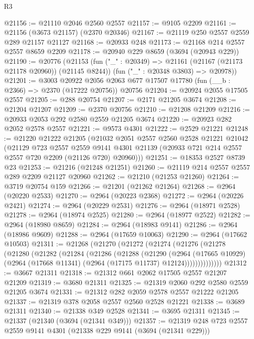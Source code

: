 \begin{lexlean}{R3}
\begin{coremodule}
@21156 := @21110 @2046 @2560 @2557
@21157 := @9105 @2209
@21161 := @21156 (@3673 @21157) (@2370 @20346)
@21167 := @21119 @250 @2557 @2559 @289 @21157 @21127
@21168 := @20933 @248
@21173 := @21168 @214 @2557 @2557 @8659 @2209
@21178 := @20940 @229 @8659 (@3694 (@20943 @229))
@21190 := @20776
    (@21153
      (fun ("_" : @20349) => @21161 (@21167 (@21173 @21178 @20960)) (@21145 @8244))
      (fun ("_" : @20348 @3803) => @20978))
@21201 := @3003
    @20922
    @2056
    @2063
    @677
    @17507
    @17780
    (fun (__b : @2366) => @2370 (@17222 @20756))
    @20756
@21204 := @20924 @2055 @17505 @2557
@21205 := @288 @20754
@21207 := @2171 @21205 @3674
@21208 := @21204 @21207
@21209 := @2370 @20756
@21210 := @21208 @21209
@21216 := @20933 @2053 @292 @2580 @2559 @21205 @3674
@21220 := @20923 @282 @2052 @2578 @2557
@21221 := @9573 @4301
@21222 := @2529 @21221
@21248 := @21220
    @21222
    @21205
    (@21032
      @2051
      @2557
      @2560
      @2528
      @21221
      @21042
      (@21129
        @723
        @2557
        @2559
        @9141
        @4301
        @21139
        (@20933 @721 @214 @2557 @2557 @720 @2209 (@21126 @720) @20960)))
@21251 := @18353 @2527 @8739 @23
@21253 := @21216 (@21248 @21251)
@21260 := @21119 @214 @2557 @2557 @289 @2209 @21127 @20960
@21262 := @21210 (@21253 @21260)
@21264 := @3719 @20754 @159
@21266 := @21201 (@21262 @21264)
@21268 := @2964 (@20220 @2533)
@21270 := @2964 (@20223 @2368)
@21272 := @2964 (@20226 @2421)
@21274 := @2964 (@20229 @2531)
@21276 := @2964 (@18971 @2528)
@21278 := @2964 (@18974 @2525)
@21280 := @2964 (@18977 @2522)
@21282 := @2964 (@18980 @8659)
@21284 := @2964 (@18983 @9141)
@21286 := @2964 (@18986 @9609)
@21288 := @2964 (@17659 @10063)
@21290 := @2964 (@17662 @10503)
@21311 := @21268
    (@21270
      (@21272
        (@21274
          (@21276
            (@21278
              (@21280
                (@21282
                  (@21284
                    (@21286
                      (@21288
                        (@21290
                          (@2964
                            (@17665 @10929)
                            (@2964 (@17668 @11341) (@2964 (@17175 @11737) @12124))))))))))))))
@21312 := @3667 @21311
@21318 := @21312 @661 @2062 @17505 @2557 @21207 @21209
@21319 := @3680 @21311
@21325 := @21319 @2060 @292 @2580 @2559 @21205 @3674
@21331 := @21312 @282 @2059 @2578 @2557 @21222 @21205
@21337 := @21319 @378 @2058 @2557 @2560 @2528 @21221
@21338 := @3689 @21311
@21340 := @21338 @349 @2528
@21341 := @3695 @21311
@21345 := @21337 (@21340 (@3694 (@21341 @349)))
@21357 := @21319 @248 @723 @2557 @2559 @9141 @4301 (@21338 @229 @9141 (@3694 (@21341 @229)))

\end{coremodule}
\end{lexlean}
